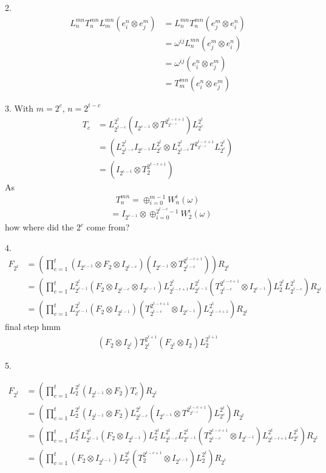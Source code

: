 \documentclass{article}
\begin{document}
	2.
	\begin{align}
		L^{mn}_nT^{mn}_nL^{mn}_m(e^n_i \otimes e^m_j)&=L^{mn}_nT^{mn}_n(e^m_j \otimes e^n_i)\\
		&=\omega^{ij}L^{mn}_n(e^m_j \otimes e^n_i) \\
		&=\omega^{ij}(e^n_i \otimes e^{m}_j) \\
		&= T^{mn}_m(e^n_i \otimes e^{m}_j) 
	\end{align}	

	3. 
	With $m=2^c$, $n=2^{t-c}$
	\begin{align}
		T_c &= L^{2^t}_{2^{t-c}}(I_{2^{c-1}} \otimes T^{2^{t-c+1}_{2^{t-c}}}) L^{2^t}_{2^c} \\
		&=(L^{2^t}_{2^{t-c}}I_{2^{c-1}}L^{2^t}_{2^c} \otimes L^{2^t}_{2^{t-c}}T^{2^{t-c+1}_{2^{t-c}}}L^{2^t}_{2^c}) \\
		&= (I_{2^{c-1}} \otimes T^{2^{t-c+1}}_{2})
	\end{align}
	As
	\begin{equation}
		T^{mn}_n = \oplus_{i=0}^{m-1} W^i_n(\omega)
	\end{equation}
	\begin{align}
		&= I_{2^{c-1}} \otimes \oplus_{i=0}^{2^{t-c}-1} W^i_2(\omega)
	\end{align}
	how where did the $2^c$ come from?
	
	4.
	\begin{align}
		F_{2^t} &= (\prod_{c=1}^{t}(I_{2^{c-1}}\otimes F_2 \otimes I_{2^{t-c}})(I_{2^{c-1}} \otimes T^{2^{t-c+1}}_{2^{t-c}}))R_{2^t} \\
		&= (\prod_{c=1}^{t}L^{2^t}_{2^{c-1}}(F_2 \otimes I_{2^{t-c}} \otimes I_{2^{c-1}} )L^{2^t}_{2^{t-c+1}} L^{2^t}_{2^{c-1}}( T^{2^{t-c+1}}_{2^{t-c}}  \otimes I_{2^{c-1}})L^{2^t}_2L^{2^t}_{2^{t-c}})R_{2^t} \\
		&=(\prod_{c=1}^{t}L^{2^t}_{2^{c-1}}(F_2 \otimes I_{2^{t-1}} )( T^{2^{t-c+1}}_{2^{t-c}}  \otimes I_{2^{c-1}})L^{2^t}_{2^{t-c+1}})R_{2^t}
	\end{align}
	final step hmm
	\begin{align}
		(F_2 \otimes I_{2^t})T^{2^{t+1}}_{2^t}(F_{2^t} \otimes I_2)L^{2^{t+1}}_2
	\end{align}
	
	5.
	
	\begin{align}
		F_{2^t} &= (\prod_{c=1}^{t}L_2^{2^t}(I_{2^{t-1}}\otimes F_2)T_c)R_{2^t} \\
		&= (\prod_{c=1}^{t}L_2^{2^t}(I_{2^{t-1}}\otimes F_2)L^{2^t}_{2^{t-c}}(I_{2^{c-1}} \otimes T^{2^{t-c+1}_{2^{t-c}}}) L^{2^t}_{2^c})R_{2^t} \\
		&= (\prod_{c=1}^{t}L_2^{2^t}L_{2^{t-1}}^{2^t}(F_2 \otimes I_{2^{t-1}})L_2^{2^t}L^{2^t}_{2^{t-c}}L_{2^{c-1}}^{2^t}(T^{2^{t-c+1}}_{2^{t-c}} \otimes I_{2^{c-1}})L_{2^{t-c+1}}^{2^{t}}L^{2^t}_{2^c})R_{2^t} \\
		&= (\prod_{c=1}^{t}(F_2 \otimes I_{2^{t-1}})L_{2^{c}}^{2^t}(T^{2^{t-c+1}}_{2} \otimes I_{2^{c-1}})L_{2}^{2^{t}})R_{2^t} \\
	\end{align}
\end{document}
